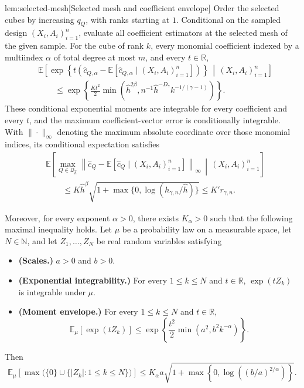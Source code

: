 \begin{lemmav}{lem:selected-mesh}[Selected mesh and coefficient envelope]
Order the selected cubes by increasing \(q_Q\), with ranks starting at \(1\). Conditional on the sampled design \((X_i,A_i)_{i=1}^n\), evaluate all coefficient estimators at the selected mesh of the given sample. For the cube of rank \(k\), every monomial coefficient indexed by a multiindex \(\alpha\) of total degree at most \(m\), and every \(t\in\mathbb R\),
\[
\begin{aligned}
&\mathbb E\!\left[
\exp\!\left\{
t\left(
\widehat c_{Q,\alpha}
-\mathbb E[\widehat c_{Q,\alpha}\mid(X_i,A_i)_{i=1}^n]
\right)
\right\}
\,\middle|\,(X_i,A_i)_{i=1}^n
\right]
\\
&\hspace{2em}\le
\exp\!\left\{
\frac{Kt^2}{2}
\min\!\left(
\widehat h^{2\beta},
n^{-1}\widehat h^{-D_\gamma}k^{-1/(\gamma-1)}
\right)
\right\}.
\end{aligned}
\]
These conditional exponential moments are integrable for every coefficient and every \(t\), and the maximum coefficient-vector error is conditionally integrable. With \(\|\cdot\|_\infty\) denoting the maximum absolute coordinate over those monomial indices, its conditional expectation satisfies
\[
\begin{aligned}
&\mathbb E\!\left[
\max_{Q\in\mathcal Q_{\widehat h}}
\left\|
\widehat c_Q-
\mathbb E[\widehat c_Q\mid(X_i,A_i)_{i=1}^n]
\right\|_\infty
\,\middle|\,(X_i,A_i)_{i=1}^n
\right]
\\
&\hspace{2em}\le
K\widehat h^\beta
\sqrt{1+\max\{0,\log(h_{\gamma,n}/\widehat h)\}}
\le K'r_{\gamma,n}.
\end{aligned}
\]

Moreover, for every exponent \(\alpha>0\), there exists \(K_\alpha>0\) such that the following maximal inequality holds. Let \(\mu\) be a probability law on a measurable space, let \(N\in\mathbb N\), and let \(Z_1,\ldots,Z_N\) be real random variables satisfying
\begin{itemize}
\item \textbf{(Scales.)} \(a>0\) and \(b>0\).
\item \textbf{(Exponential integrability.)} For every \(1\le k\le N\) and \(t\in\mathbb R\), \(\exp(tZ_k)\) is integrable under \(\mu\).
\item \textbf{(Moment envelope.)} For every \(1\le k\le N\) and \(t\in\mathbb R\),
\[
\mathbb E_\mu[\exp(tZ_k)]
\le
\exp\!\left\{
\frac{t^2}{2}\min(a^2,b^2k^{-\alpha})
\right\}.
\]
\end{itemize}
Then
\[
\mathbb E_\mu\!\left[
\max\bigl(\{0\}\cup\{|Z_k|:1\le k\le N\}\bigr)
\right]
\le
K_\alpha a
\sqrt{1+\max\!\left\{0,\log\!\left((b/a)^{2/\alpha}\right)\right\}}.
\]
\end{lemmav}

